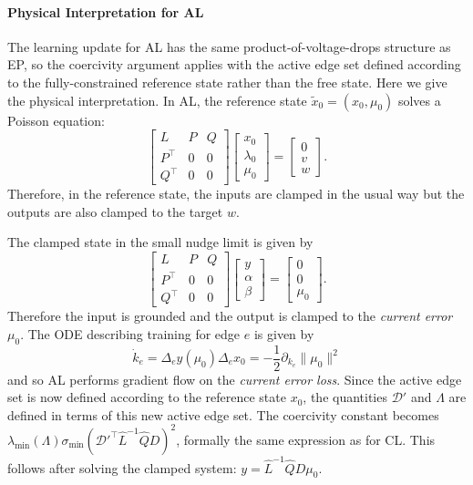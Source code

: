 \documentclass{siamart}
\begin{document}
\paragraph{Physical Interpretation for AL}
The learning update for AL has the same product-of-voltage-drops structure as EP, so the coercivity argument applies with the active edge set defined according to the fully-constrained reference state rather than the free state. Here we give the physical interpretation. In AL, the reference state $\tilde{x}_0 = (x_0,\mu_0)$ solves a Poisson equation:
\begin{equation*}
    \begin{bmatrix}
        L & P  & Q
        \\ P^\top & 0&  0
        \\ Q^\top & 0 &0
    \end{bmatrix}
\begin{bmatrix}
    x_0 \\ \lambda_0 \\ \mu_0
\end{bmatrix}
=
 \begin{bmatrix}
        0 \\ v \\ w
         \end{bmatrix}.
\end{equation*}
Therefore, in the reference state, the inputs are clamped in the usual way but the outputs are also clamped to the target $w$.

The clamped state in the small nudge limit is given by
\begin{equation*}
    \begin{bmatrix}
        L & P  & Q
        \\ P^\top & 0&  0
        \\ Q^\top & 0 &0
    \end{bmatrix}
\begin{bmatrix}
    y\\ \alpha \\ \beta
\end{bmatrix}
=
 \begin{bmatrix}
        0 \\ 0 \\ \mu_0
         \end{bmatrix}.
\end{equation*}
Therefore the input is grounded and the output is clamped to the \textit{current error} $\mu_0$. The ODE describing training for edge $e$ is given by
\begin{equation}
    \dot{k}_e = \Delta_e y(\mu_0) \Delta_ex_0 =-\frac{1}{2} \partial_{k_e} \|\mu_0\|^2
\end{equation}
and so AL performs gradient flow on the \textit{current error loss}. Since the active edge set is now defined according to the reference state $x_0$, the quantities $\mathscr{D}'$ and $\Lambda$ are defined in terms of this new active edge set. The coercivity constant becomes $\lambda_{\min}(\Lambda)\sigma_{\min}\left(\mathscr{D}'^\top \hat{L}^{-1}\hat{Q}D\right)^2$, formally the same expression as for CL. This follows after solving the clamped system: $y = \hat{L}^{-1}\hat{Q}D\mu_0$.
\end{document}
